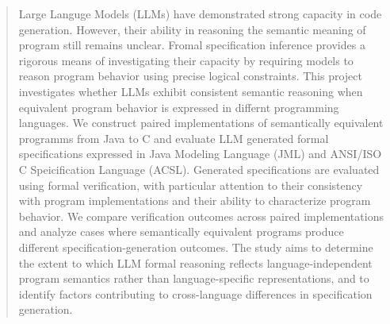 \begin{abstract}
    Large Languge Models (LLMs) have demonstrated strong capacity in code generation. However, their ability in reasoning the semantic meaning
    of program still remains unclear. Fromal specification inference provides a rigorous means of investigating their capacity by requiring models to 
    reason program behavior using precise logical constraints. This project investigates whether LLMs exhibit consistent semantic reasoning when equivalent program
    behavior is expressed in differnt programming languages. We construct paired implementations of semantically equivalent programms from Java to C and evaluate 
    LLM generated formal specifications expressed in Java Modeling Language (JML) and ANSI/ISO C Speicification Language (ACSL). Generated specifications 
    are evaluated using formal verification, with particular attention to their consistency with program implementations and their ability to characterize 
    program behavior. We compare verification outcomes across paired implementations and analyze cases where semantically equivalent 
    programs produce different specification-generation outcomes. 
    The study aims to determine the extent to which LLM formal reasoning reflects language-independent program semantics rather than 
    language-specific representations, and to identify factors contributing to cross-language differences in specification generation.
\end{abstract}